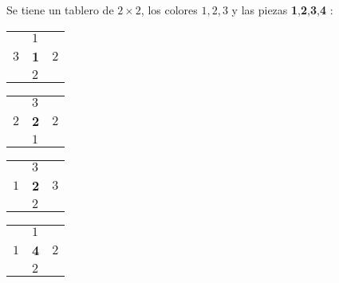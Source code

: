 \documentclass[11pt, a4paper, twoside]{article}
\begin{document}
\begin{ejemplo}

	Se tiene un tablero de $2\times 2$, los colores $1,2,3$
    y las piezas \textbf{1},\textbf{2},\textbf{3},\textbf{4} $:$

  \begin{center}
    \begin{minipage}{0.2\textwidth}
        \begin{tabular}{ |l l l|}
            \hline
                 & $1$     &       \\
            $3$  & \textbf{1} &   $2$ \\
                 & $2$     &       \\
            \hline
        \end{tabular}
    \end{minipage}
    \begin{minipage}{0.2\textwidth}
        \begin{tabular}{ |l l l|}
            \hline
                 & $3$     &       \\
            $2$  & \textbf{2} & $2$ \\
                 & $1$     &       \\
            \hline
        \end{tabular}
    \end{minipage}
    \begin{minipage}{0.2\textwidth}
        \begin{tabular}{ |l l l|}
            \hline
                 & $3$      &       \\
            $1$  & \textbf{2}  & $3$ \\
                 & $2$      &       \\
            \hline
        \end{tabular}
    \end{minipage}
    \begin{minipage}{0.2\textwidth}
        \begin{tabular}{ |l l l|}
            \hline
                 & $1$      &       \\
            $1$  & \textbf{4}  & $2$   \\
                 & $2$      &       \\
            \hline
        \end{tabular}
    \end{minipage}
   \end{center}


\end{ejemplo}
\end{document}
